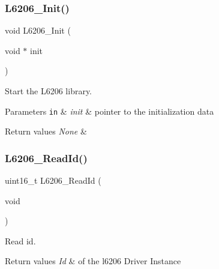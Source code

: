 \subsubsection{\texorpdfstring{L6206\+\_\+\+Init()}{L6206\_Init()}}
{\footnotesize\ttfamily void L6206\+\_\+\+Init (\begin{DoxyParamCaption}\item[{void $\ast$}]{init }\end{DoxyParamCaption})}



Start the L6206 library. 


\begin{DoxyParams}[1]{Parameters}
\mbox{\tt in}  & {\em init} & pointer to the initialization data \\
\hline
\end{DoxyParams}

\begin{DoxyRetVals}{Return values}
{\em None} & \\
\hline
\end{DoxyRetVals}
\mbox{\label{group___l6206___exported___functions_ga853fd3a4a008922950a77d5988633549}} 
\subsubsection{\texorpdfstring{L6206\+\_\+\+Read\+Id()}{L6206\_ReadId()}}
{\footnotesize\ttfamily uint16\+\_\+t L6206\+\_\+\+Read\+Id (\begin{DoxyParamCaption}\item[{void}]{ }\end{DoxyParamCaption})}



Read id. 


\begin{DoxyRetVals}{Return values}
{\em Id} & of the l6206 Driver Instance \\
\hline
\end{DoxyRetVals}
\mbox{\label{group___l6206___exported___functions_gafc7601e986586d361a66bc38687fd56c}} 
